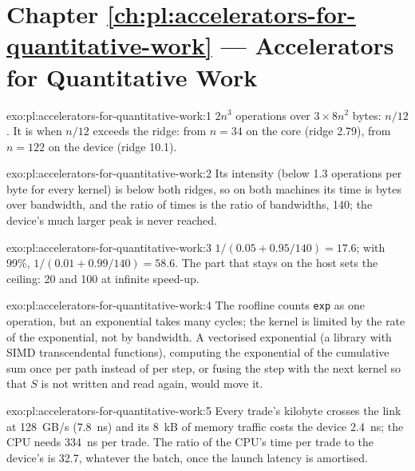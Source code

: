 \section*{Chapter \ref{ch:pl:accelerators-for-quantitative-work} --- Accelerators for Quantitative Work}

\begin{solution}{exo:pl:accelerators-for-quantitative-work:1}
$2n^3$ operations over $3 \times 8n^2$ bytes: $n/12$. It is  when $n/12$ exceeds the ridge: from $n = 34$ on the core (ridge 2.79),
from $n = 122$ on the device (ridge 10.1).
\end{solution}

\begin{solution}{exo:pl:accelerators-for-quantitative-work:2}
Its intensity (below 1.3 operations per byte for every kernel) is below both ridges, so on both machines its time is bytes over bandwidth,
and the ratio of times is the ratio of bandwidths, 140; the device's much larger peak is never reached.
\end{solution}

\begin{solution}{exo:pl:accelerators-for-quantitative-work:3}
$1/(0.05 + 0.95/140) = 17.6$; with 99\%, $1/(0.01 + 0.99/140) = 58.6$. The part that stays on the host sets the ceiling: 20 and 100 at
infinite speed-up.
\end{solution}

\begin{solution}{exo:pl:accelerators-for-quantitative-work:4}
The roofline counts \texttt{exp} as one operation, but an exponential takes many cycles; the kernel is limited by the rate of the
exponential, not by bandwidth. A vectorised exponential (a library with SIMD transcendental functions), computing the exponential of the
cumulative sum once per path instead of per step, or fusing the step with the next kernel so that $S$ is not written and read again, would
move it.
\end{solution}

\begin{solution}{exo:pl:accelerators-for-quantitative-work:5}
Every trade's kilobyte crosses the link at 128~GB/s (7.8~ns) and its 8~kB of memory traffic costs the device 2.4~ns; the CPU needs 334~ns per
trade. The ratio of the CPU's time per trade to the device's is 32.7, whatever the batch, once the launch latency is amortised.
\end{solution}

